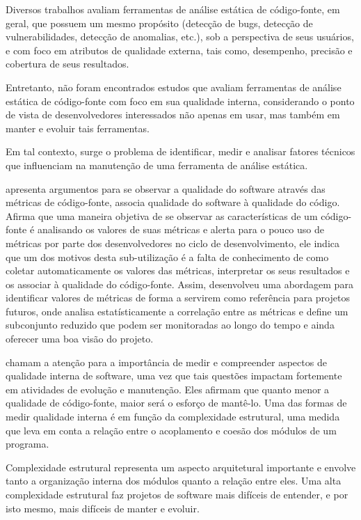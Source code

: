 Diversos trabalhos avaliam ferramentas de análise estática de código-fonte, em
geral, que possuem um mesmo propósito (detecção de bugs, detecção de
vulnerabilidades, detecção de anomalias, etc.), sob a perspectiva de seus
usuários, e com foco em atributos de qualidade externa, tais como, desempenho,
precisão e cobertura de seus resultados. 

Entretanto, não foram encontrados estudos que avaliam ferramentas de análise
estática de código-fonte com foco em sua qualidade interna, considerando o
ponto de vista de desenvolvedores interessados não apenas em usar, mas também
em manter e evoluir tais ferramentas.

Em tal contexto, surge o problema de identificar, medir e analisar fatores
técnicos que influenciam na manutenção de uma ferramenta de análise estática. 

 apresenta argumentos para se observar a qualidade
do software através das métricas de código-fonte, associa qualidade do
software à qualidade do código. Afirma que uma maneira objetiva de se observar
as características de um código-fonte é analisando os valores de suas métricas
e alerta para o pouco uso de métricas por parte dos desenvolvedores no ciclo
de desenvolvimento, ele indica que um dos motivos desta sub-utilização
é a falta de conhecimento de como coletar automaticamente
os valores das métricas, interpretar os seus resultados e os associar à
qualidade do código-fonte. Assim, desenvolveu uma abordagem para identificar
valores de métricas de forma a servirem como referência para projetos futuros,
onde analisa estatísticamente a correlação entre as métricas e define um
subconjunto reduzido que podem ser monitoradas ao longo do tempo e
ainda oferecer uma boa visão do projeto.

 chamam a atenção para a importância de medir e
compreender aspectos de qualidade interna de software, uma vez que tais
questões impactam fortemente em atividades de evolução e manutenção. Eles
afirmam que quanto menor a qualidade de código-fonte, maior será o esforço de
mantê-lo. Uma das formas de medir qualidade interna é em função da
complexidade estrutural, uma medida que leva em conta a relação entre o
acoplamento e coesão dos módulos de um programa.

Complexidade estrutural representa um aspecto arquitetural importante e envolve
tanto a organização interna dos módulos quanto a relação entre eles. Uma alta
complexidade estrutural faz projetos de software mais difíceis de entender, e
por isto mesmo, mais difíceis de manter e evoluir.

